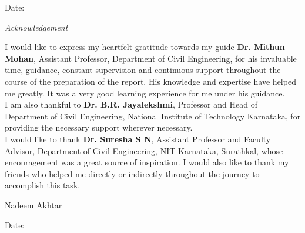 \documentclass[12pt,letterpaper]{report}
\begin{document}
\begin{flushleft}
Date: 
\end{flushleft}

\newpage
\thispagestyle{empty}
\begin{center}
\emph{\LARGE Acknowledgement}\\[2.5cm]
\end{center}
I would like to express my heartfelt gratitude towards my guide \textbf{Dr. Mithun Mohan}, Assistant Professor, Department of Civil Engineering, for his invaluable
time, guidance, constant supervision and continuous support throughout the course of
the preparation of the report. His knowledge and expertise have helped me greatly. It
was a very good learning experience for me under his guidance. \\
I am also thankful to
\textbf{Dr. B.R. Jayalekshmi}, Professor and Head of Department of Civil Engineering, National Institute of Technology Karnataka, for
providing the necessary support wherever necessary.\\
I would like to thank \textbf{Dr. Suresha S N}, Assistant Professor and Faculty Advisor, Department of Civil
Engineering, NIT Karnataka, Surathkal, whose encouragement was a great source of inspiration. I would also like to thank my friends who helped
me directly or indirectly throughout the journey to accomplish this task.\\[1.0cm]
\vfill

\begin{flushright}
Nadeem Akhtar \\[1.5cm]
\end{flushright}

\begin{flushleft}
Date: 
\end{flushleft}
\end{document}
